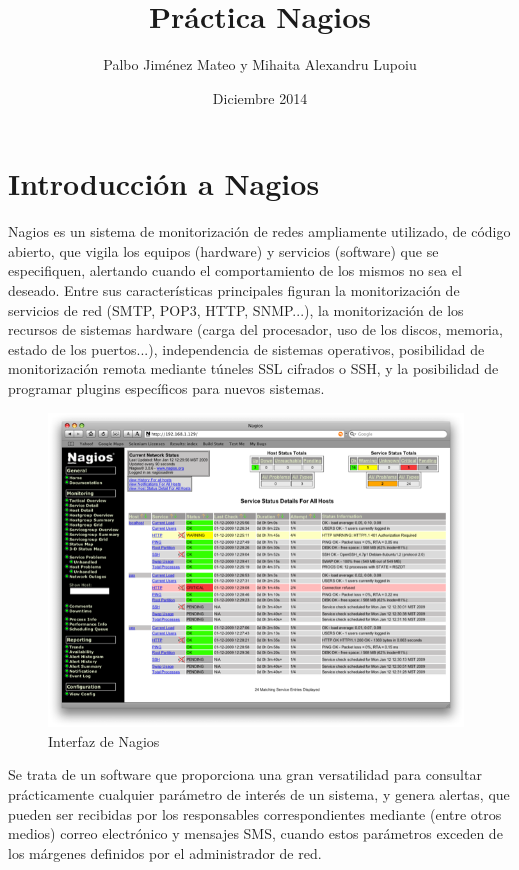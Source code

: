 \documentclass[11pt,a4paper]{article}
\title{Práctica Nagios}
\author{Palbo Jiménez Mateo y Mihaita Alexandru Lupoiu}
\date{Diciembre 2014}
\begin{document}
\maketitle
\tableofcontents
\clearpage

\section{Introducción a Nagios}

    Nagios es un sistema de monitorización de redes ampliamente utilizado, de código abierto, que vigila los equipos (hardware) y servicios (software) que se especifiquen, alertando cuando el comportamiento de los mismos no sea el deseado. Entre sus características principales figuran la monitorización de servicios de red (SMTP, POP3, HTTP, SNMP...), la monitorización de los recursos de sistemas hardware (carga del procesador, uso de los discos, memoria, estado de los puertos...), independencia de sistemas operativos, posibilidad de monitorización remota mediante túneles SSL cifrados o SSH, y la posibilidad de programar plugins específicos para nuevos sistemas\cite{nagios-wikipedia}.
    
\begin{figure}[hbtp]
\centerline{\includegraphics[width=11cm]{nagios3-1.png}}
\caption{Interfaz de Nagios}
\label{figura-Nagios}
\end{figure}    

    Se trata de un software que proporciona una gran versatilidad para consultar prácticamente cualquier parámetro de interés de un sistema, y genera alertas, que pueden ser recibidas por los responsables correspondientes mediante (entre otros medios) correo electrónico y mensajes SMS, cuando estos parámetros exceden de los márgenes definidos por el administrador de red.
\end{document}
